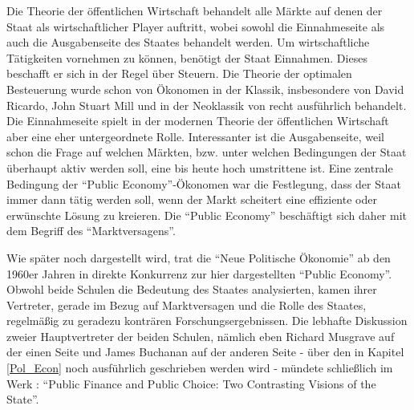 Die Theorie der öffentlichen Wirtschaft behandelt alle Märkte auf denen der Staat als wirtschaftlicher Player auftritt, wobei sowohl die Einnahmeseite als auch die Ausgabenseite des Staates behandelt werden. Um wirtschaftliche Tätigkeiten vornehmen zu können, benötigt der Staat Einnahmen. Dieses beschafft er sich in der Regel über Steuern. Die Theorie der optimalen Besteuerung wurde schon von Ökonomen in der Klassik, insbesondere von David Ricardo, John Stuart Mill und in der Neoklassik von \textcite[Kapitel 38]{Walras1874} recht ausführlich behandelt. Die Einnahmeseite spielt in der modernen Theorie der öffentlichen Wirtschaft aber eine eher untergeordnete Rolle. Interessanter ist die Ausgabenseite, weil schon die Frage auf welchen Märkten, bzw. unter welchen Bedingungen der Staat überhaupt aktiv werden soll, eine bis heute hoch umstrittene ist. Eine zentrale Bedingung der "`Public Economy"'-Ökonomen war die Festlegung, dass der Staat immer dann tätig werden soll, wenn der Markt scheitert eine effiziente oder erwünschte Lösung zu kreieren. Die "`Public Economy"' beschäftigt sich daher mit dem Begriff des "`Marktversagens"'.

Wie später noch dargestellt wird, trat die "`Neue Politische Ökonomie"' ab den 1960er Jahren in direkte Konkurrenz zur hier dargestellten "`Public Economy"'. Obwohl beide Schulen die Bedeutung des Staates analysierten, kamen ihrer Vertreter, gerade im Bezug auf Marktversagen und die Rolle des Staates, regelmäßig zu geradezu konträren Forschungsergebnissen. Die lebhafte Diskussion zweier Hauptvertreter der beiden Schulen, nämlich eben Richard Musgrave auf der einen Seite und James Buchanan auf der anderen Seite - über den in Kapitel \ref{Pol_Econ} noch ausführlich geschrieben werden wird - mündete schließlich im Werk \textcite{Musgrave1999}: "`Public Finance and Public Choice: Two Contrasting Visions of the State"'.

